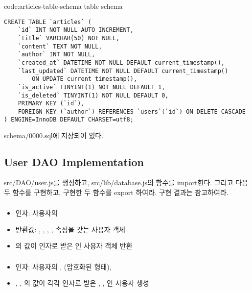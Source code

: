 \begin{code}{code:articles-table-schema}{ table schema}
\begin{verbatim}
CREATE TABLE `articles` (
    `id` INT NOT NULL AUTO_INCREMENT,
    `title` VARCHAR(50) NOT NULL,
    `content` TEXT NOT NULL,
    `author` INT NOT NULL,
    `created_at` DATETIME NOT NULL DEFAULT current_timestamp(),
    `last_updated` DATETIME NOT NULL DEFAULT current_timestamp()
        ON UPDATE current_timestamp(),
    `is_active` TINYINT(1) NOT NULL DEFAULT 1,
    `is_deleted` TINYINT(1) NOT NULL DEFAULT 0,
    PRIMARY KEY (`id`),
    FOREIGN KEY (`author`) REFERENCES `users`(`id`) ON DELETE CASCADE
) ENGINE=InnoDB DEFAULT CHARSET=utf8;
\end{verbatim}
\end{code}

\와 \는 schema/0000.sql에 저장되어 있다.

\subsection*{User DAO Implementation}

src/DAO/user.js를 생성하고, src/lib/database.js의  함수를 import한다. 그리고 다음 두 함수를 구현하고, 구현한 두 함수를 export 하여라. 구현 결과는 \를 참고하여라.

\subsubsection*{}
\begin{itemize}
    \item 인자: 사용자의 
    \item 반환값: , , , ,  속성을 갖는 사용자 객체
    \item {}의 값이 인자로 받은 인 사용자 객체 반환
\end{itemize}

\subsubsection*{}
\begin{itemize}
    \item 인자: 사용자의 ,  (암호화된 형태), 
    \item {}, , 의 값이 각각 인자로 받은 , , 인 사용자 생성
\end{itemize}

